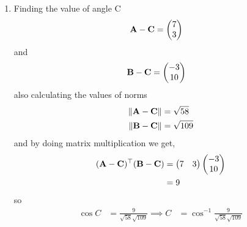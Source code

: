 \documentclass[11pt]{book}
\begin{document}
\begin{enumerate}[label=\thesection.\arabic*.,ref=\thesection.\theenumi]
\begin{enumerate}
\item Finding the value of angle C
\begin{align}
	\mathbf{A}-\mathbf{C} &=\begin{pmatrix}7\\3\end{pmatrix}
\end{align}
and 
\begin{align}
	\mathbf{B}-\mathbf{C}&= \begin{pmatrix}-3\\10\end{pmatrix}
\end{align}
also calculating the values of norms
\begin{align}
	\left\lVert\mathbf{A}-\mathbf{C}\right\rVert &= \sqrt{58}\\
	\left\lVert\mathbf{B}-\mathbf{C}\right\rVert &= \sqrt{109}
\end{align}
and by doing matrix multiplication we get,
\begin{align}
\begin{split}
	(\mathbf{A}-\mathbf{C})^{\top}(\mathbf{B}-\mathbf{C})&=\begin{pmatrix}7&3\end{pmatrix}\begin{pmatrix}-3\\10\end{pmatrix}\\
	&=9
\end{split}
\end{align}
so 
\begin{align}
	\cos{C}&= \frac{9}{\sqrt{58} \sqrt{109}}
	\implies C&=\cos^{-1}{ \frac{9}{\sqrt{58} \sqrt{109}}}
\end{align}
\end{enumerate}
\end{enumerate}
%
\end{document}
